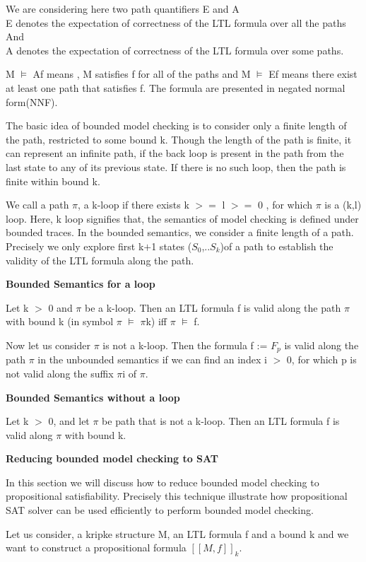 We are considering here two path quantifiers E and A \\
E denotes the expectation of correctness of the LTL formula over all the paths \\
And \\
A denotes the expectation of correctness of the LTL formula over some paths.

M $\models$ Af means , M satisfies f  for all of the paths and M $\models$ Ef means there exist
at least one path that satisfies f. The formula are presented in negated normal form(NNF).

The basic idea of bounded model checking is to consider only a finite length of 
the path, restricted to some bound k. Though the length of the path is finite, 
it can represent an infinite path, if the back loop is present in the path from 
the last state to any of its previous state. If  there is no such loop, then
the path is finite within bound k.


We call a path $\pi$, a k-loop if there exists  k $>=$ l $>=$ 0 , for which $\pi$ is a 
(k,l) loop. Here, k loop signifies that, the semantics of model checking is 
defined under bounded traces. In the bounded semantics, we consider a finite
length of a path. Precisely we only explore first k$+$1 states ($S_0$,..$S_k$)of a path
to establish the validity of the LTL formula along the path.

\textbf{Bounded Semantics for a loop}

Let k $>$ 0 and $\pi$ be a k-loop. Then  an LTL formula f is valid along the path 
$\pi$ with bound k (in symbol $\pi$ $\models$ $\pi$k) iff $\pi$ $\models$ f.

Now let us consider $\pi$ is not a k-loop. Then the formula f := $F_p$ is valid 
along the path $\pi$ in the unbounded semantics if we can find an index i $>$ 0, for
which p is not valid along the suffix $\pi$i of $\pi$.

\textbf{Bounded Semantics without a loop}

Let k $>$ 0, and let $\pi$ be  path that is not a k-loop. Then an LTL formula f 
is valid along $\pi$ with bound k.


\textbf{Reducing bounded model checking to SAT}

In this section we will discuss how to reduce bounded model checking to 
propositional satisfiability. Precisely this technique illustrate how propositional
SAT solver can be used efficiently to perform bounded model checking.

Let us consider, a kripke structure M, an LTL formula f and a bound k and we want 
to construct a propositional formula $[[ M,f ]]_k$.

